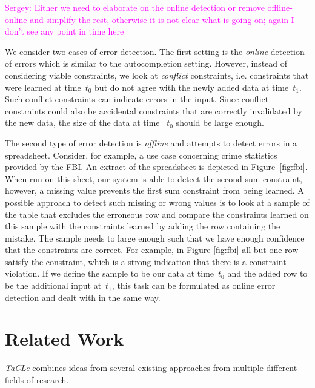 \documentclass{IEEEtran}
\newcommand{\sergey}[1]{\textcolor{magenta}{{\sc Sergey:} #1}\xspace}
\newcommand{\format}[1]{\textit{#1}\xspace}
\newcommand{\sname}{\format{TaCLe}}
\theoremstyle{definition}
\begin{document}
\sergey{Either we need to elaborate on the online detection or remove offline-online and simplify the rest, otherwise it is not clear what is going on; again I don't see any point in time here}

We consider two cases of error detection.
The first setting is the \textit{online} detection of errors which is similar to the autocompletion setting.
However, instead of considering viable constraints, we look at \textit{conflict} constraints, i.e. constraints that were learned at time~$t_0$ but do not agree with the newly added data at time~$t_1$.
Such conflict constraints can indicate errors in the input.
Since conflict constraints could also be accidental constraints that are correctly invalidated by the new data, the size of the data at time ~$t_0$ should be large enough.

The second type of error detection is \textit{offline} and attempts to detect errors in a spreadsheet.
Consider, for example, a use case concerning crime statistics provided by the FBI.
An extract of the spreadsheet is depicted in Figure~\ref{fig:fbi}.
When run on this sheet, our system is able to detect the second sum constraint, however, a missing value prevents the first sum constraint from being learned.
A possible approach to detect such missing or wrong values is to look at a sample of the table that excludes the erroneous row and compare the constraints learned on this sample with the constraints learned by adding the row containing the mistake.
The sample needs to large enough such that we have enough confidence that the constraints are correct. For example, in Figure \ref{fig:fbi} all but one row satisfy the constraint, which is a strong indication that there is a constraint violation.
If we define the sample to be our data at time~$t_0$ and the added row to be the additional input at~$t_1$, this task can be formulated as online error detection and dealt with in the same way.

\section{Related Work}\label{sec:related_work}
\sname combines ideas from several existing
approaches from multiple different fields of research.
\end{document}
